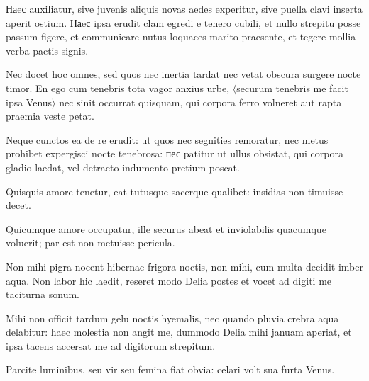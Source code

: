 \noindent Наeс auxiliatur, sive juvenis aliquis novas aedes experitur, sive puella clavi inserta aperit ostium. Наeс ipsa erudit clam egredi e tenero cubili, et nullo strepitu posse passum figere, et communicare nutus loquaces marito praesente, et tegere mollia verba pactis signis. \\

{\large

\noindent Nec docet hoc omnes, sed quos nec inertia tardat nec vetat obscura surgere nocte timor. En ego cum tenebris tota vagor anxius urbe, $\langle$securum tenebris me facit ipsa Venus$\rangle$ nec sinit occurrat quisquam, qui corpora ferro volneret aut rapta praemia veste petat.\\

}


\noindent Neque cunctos ea de re erudit: ut quos nec segnities remoratur, nec metus prohibet expergisci nocte tenebrosa: пес patitur ut ullus obsistat, qui corpora gladio laedat, vel detracto indumento pretium poscat. \\



{\large

\noindent Quisquis amore tenetur, eat tutusque sacerque qualibet: insidias non timuisse decet.\\

}


\noindent Quicumque amore occupatur, ille securus abeat et inviolabilis quacumque voluerit; par est non metuisse pericula. \\

\newpage

{\large

\noindent Non mihi pigra nocent hibernae frigora noctis, non mihi, cum multa decidit imber aqua. Non labor hic laedit, reseret modo Delia postes et vocet ad digiti me taciturna sonum.\\

}


\noindent Mihi non officit tardum gelu noctis hyemalis, nec quando pluvia crebra aqua delabitur: haec molestia non angit me, dummodo Delia mihi januam aperiat, et ipsa tacens accersat me ad digitorum strepitum. \\



{\large

\noindent Parcite luminibus, seu vir seu femina fiat obvia: celari volt sua furta Venus.\\

}



